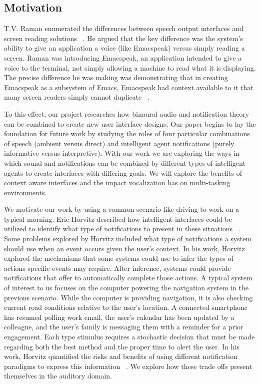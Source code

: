 \subsection{                 Motivation                                      }

T.V. Raman enumerated the differences between speech output interfaces and
screen reading solutions ~. He argued that the key
difference was the system's ability to give an application a voice (like
Emacspeak) versus simply reading a screen. Raman was introducing Emacspeak, an
application intended to give a voice to the terminal, not simply allowing a
machine to read what it is displaying. The precise difference he was making was
demonstrating that in creating Emacspeak as a subsystem of Emacs, Emacspeak had
context available to it that many screen readers simply cannot duplicate
~\cite{raman1996emacspeak}.

To this effect, our project researches how binaural audio and notification theory
can be combined to create new user interface designs. Our paper begins to lay the
foundation for future work by studying the roles of four particular combinations
of speech (ambient versus direct) and intelligent agent notifications (purely
informative versus interpretive). With our work we are exploring the ways in which
sound and notifications can be combined by different types of intelligent agents
to create interfaces with differing goals. We will explore the benefits of context
aware interfaces and the impact vocalization has on multi-tasking environments.


We motivate our work by using a common scenario like driving to work on a typical
morning. Eric Horvitz described how intelligent interfaces could be utilized to identify
what type of notifications to present in these situations ~\cite{horvitz1999principles}.
Some problems explored by Horvitz included what type of notifications a system should
use when an event occurs given the user's context.  In his work, Horvitz explored the
mechanisms that some systems could use to infer the types of actions specific events
may require. After inference, systems could provide notifications that offer to
automatically complete those actions.  A typical system of interest to us focuses
on the computer powering the navigation system in the previous scenario. While the
computer is providing navigation, it is also checking current road conditions
relative to the user's location. A connected smartphone has resumed polling work
email, the user's calendar has been updated by a colleague, and the user's
family is messaging them with a reminder for a prior engagement.  Each type stimulus
requires a stochastic decision that must be made regarding both the best method and
the proper time to alert the user. In his work, Horvitz quantified
the risks and benefits of using different notification paradigms to express this
information ~\cite{horvitz1999principles}. We explore how these trade offs present
themselves in the auditory domain.

